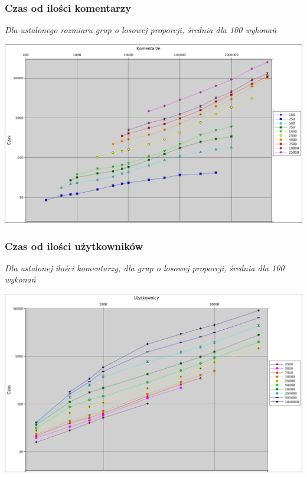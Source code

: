 \documentclass[11pt]{article}
\newcommand{\+}{\discretionary{\mbox{\scriptsize$\hookleftarrow$}}{}{}}
\begin{document}
\subsubsection{Czas od ilości komentarzy}
\textsl{Dla ustalonego rozmiaru grup o losowej proporcji, średnia dla 100 wykonań}\\
\begin{centering}
	\includegraphics[width=\textwidth]{Wykres1}
\end{centering}

\subsubsection{Czas od ilości użytkowników}
\textsl{Dla ustalonej ilości komentarzy, dla grup o losowej proporcji, średnia dla 100 wykonań}\\
\begin{centering}
	\includegraphics[width=\textwidth]{Wykres2}
\end{centering}
\end{document}
